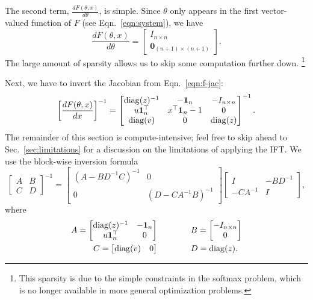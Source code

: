 \documentclass[11pt]{article}
\begin{document}
The second term, $\frac{dF(\theta,x)}{d\theta}$, is simple.
Since $\theta$ only appears in the first vector-valued function of $F$
(see Eqn.~\ref{eqn:system}), we have
\begin{equation}
\label{eqn:df-dtheta}
\frac{dF(\theta,x)}{d\theta} = \begin{bmatrix}
    I_{n\times n}\\
    \mathbf{0}_{(n+1)\times (n+1)}
\end{bmatrix}.
\end{equation}
The large amount of sparsity allows us to skip some computation further down.
\footnote{This sparsity is due to the simple constraints in the softmax problem,
which is no longer available in more general optimization problems.}

Next, we have to invert the Jacobian from Eqn.~\ref{eqn:f-jac}:
\begin{equation}
\label{eqn:dsystem-matrix}
\left[\frac{dF(\theta,x)}{dx}\right]^{-1} = \begin{bmatrix}
\mathrm{diag}(z)^{-1} & -\mathbf{1}_n & -I_{n\times n} \\
u\mathbf{1}_n^\top & x^\top\mathbf{1}_n - 1 & 0\\
\mathrm{diag}(v) & 0 & \mathrm{diag}(z)
\end{bmatrix}^{-1}.
\end{equation}
The remainder of this section is compute-intensive;
feel free to skip ahead to Sec.~\ref{sec:limitations} for a discussion
on the limitations of applying the IFT.
We use the block-wise inversion formula
\begin{equation*}
\begin{bmatrix}
A & B\\
C & D
\end{bmatrix}^{-1} = \begin{bmatrix}
    (A - BD^{-1}C)^{-1} & 0\\
    0 & (D - CA^{-1}B)^{-1}
\end{bmatrix}
\begin{bmatrix}
    I & -BD^{-1}\\
    -CA^{-1} & I
\end{bmatrix},
\end{equation*}
where
\begin{align*}
A = \begin{bmatrix} \mathrm{diag}(z)^{-1} & -\mathbf{1}_n \\ u\mathbf{1}_n^\top & 0 \end{bmatrix}&\qquad\qquad
B = \begin{bmatrix}-I_{n\times n} \\ 0\end{bmatrix}\\
C = \begin{bmatrix}\mathrm{diag}(v) & 0\end{bmatrix} &\qquad\qquad
D = \mathrm{diag}(z).
\end{align*}
\end{document}
